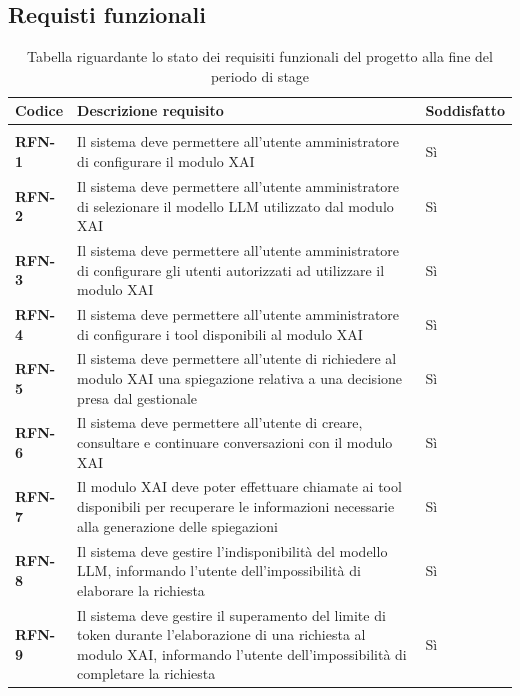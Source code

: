 \subsection{Requisti funzionali}
\keepXColumns
{}
    \begin{longtable}{|l|p{}|l|}
        \hline
        \rowcolor{gold}
        \textbf{Codice} & \textbf{Descrizione requisito} & \textbf{Soddisfatto} \\
        \hline
        \endhead

        \hline
        \rowcolor{white}
        \caption{Tabella riguardante lo stato dei requisiti funzionali del progetto alla fine del periodo di stage} \label{tab:requisiti_stato_funzionali} \\
        \endlastfoot 

        \textbf{RFN-1} & Il sistema deve permettere all'utente amministratore di configurare il modulo XAI & Sì \\
        \hline
        \textbf{RFN-2} & Il sistema deve permettere all'utente amministratore di selezionare il modello LLM utilizzato dal modulo XAI & Sì  \\
        \hline
        \textbf{RFN-3} & Il sistema deve permettere all'utente amministratore di configurare gli utenti autorizzati ad utilizzare il modulo XAI & Sì  \\
        \hline
        \textbf{RFN-4} & Il sistema deve permettere all'utente amministratore di configurare i tool disponibili al modulo XAI & Sì  \\
        \hline
        \textbf{RFN-5} & Il sistema deve permettere all'utente di richiedere al modulo XAI una spiegazione relativa a una decisione presa dal gestionale & Sì\\
        \hline
        \textbf{RFN-6} & Il sistema deve permettere all'utente di creare, consultare e continuare conversazioni con il modulo XAI & Sì \\
        \hline
        \textbf{RFN-7} & Il modulo XAI deve poter effettuare chiamate ai tool disponibili per recuperare le informazioni necessarie alla generazione delle spiegazioni & Sì \\
        \hline
        \textbf{RFN-8} & Il sistema deve gestire l'indisponibilità del modello LLM, informando l'utente dell'impossibilità di elaborare la richiesta & Sì  \\
        \hline
        \textbf{RFN-9} & Il sistema deve gestire il superamento del limite di token durante l'elaborazione di una richiesta al modulo XAI, informando l'utente dell'impossibilità di completare la richiesta & Sì \\

\end{longtable}
